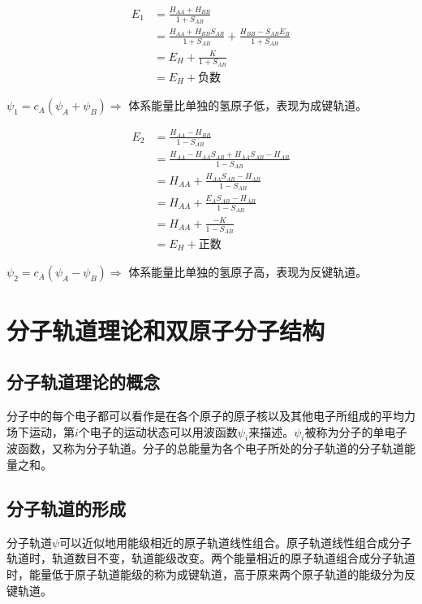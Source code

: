 \begin{align*}
    E_1 &= \frac{H_{AA} + H_{BB}}{1 + S_{AB}} \\
    &= \frac{H_{AA} + H_{BB}S_{AB}}{1 + S_{AB}} + \frac{H_{BB} - S_{AB}E_B}{1 + S_{AB}} \\
    &= E_H + \frac{K}{1 + S_{AB}} \\
    &= E_H + \mbox{负数}
\end{align*}

$\psi_1 = c_A \left( \psi_A + \psi_B \right) \Rightarrow$ 体系能量比单独的氢原子低，表现为成键轨道。 

\begin{align*}
    E_2 &= \frac{H_{AA} - H_{BB}}{1 - S_{AB}} \\
    &= \frac{H_{AA} - H_{AA}S_{AB} + H_{AA}S_{AB} - H_{AB}}{1 - S_{AB}} \\
    &= H_{AA} + \frac{H_{AA}S_{AB} - H_{AB}}{1 - S_{AB}} \\
    &= H_{AA} + \frac{E_AS_{AB} - H_{AB}}{1 - S_{AB}} \\
    &= H_{AA} + \frac{-K}{1 - S_{AB}} \\
    &= E_H + \mbox{正数}
\end{align*}

$\psi_2 = c_A \left( \psi_A - \psi_B \right) \Rightarrow$ 体系能量比单独的氢原子高，表现为反键轨道。


\section{分子轨道理论和双原子分子结构}

\subsection{分子轨道理论的概念}


分子中的每个电子都可以看作是在各个原子的原子核以及其他电子所组成的平均力场下运动，第$i$个电子的运动状态可以用波函数$\psi_i$来描述。$\psi_i$被称为分子的单电子波函数，又称为分子轨道。分子的总能量为各个电子所处的分子轨道的分子轨道能量之和。


\subsection{分子轨道的形成}

分子轨道$\psi$可以近似地用能级相近的原子轨道线性组合。原子轨道线性组合成分子轨道时，轨道数目不变，轨道能级改变。两个能量相近的原子轨道组合成分子轨道时，能量低于原子轨道能级的称为成键轨道，高于原来两个原子轨道的能级分为反键轨道。

